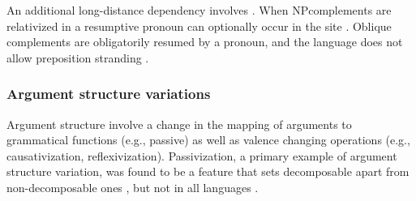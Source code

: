 \documentclass[output=paper]{langsci/langscibook}
\begin{document}
An additional long-distance dependency involves . When NP\linebreak complements are relativized in  a resumptive pronoun can optionally occur in the  site . Oblique complements are obligatorily resumed by a pronoun, and the language does not allow preposition stranding .

\eal
\zl

\subsubsection{Argument structure variations}

Argument structure  involve a change in the mapping of arguments to grammatical functions (e.g., passive) as well as valence changing operations (e.g., causativization, reflexivization). Passivization, a primary example of argument structure variation, was
found to be a feature that sets decomposable  apart from non-decomposable ones
\citep{nunberg94}, but not in all languages \citep{bargmannsailer15}.
\end{document}
